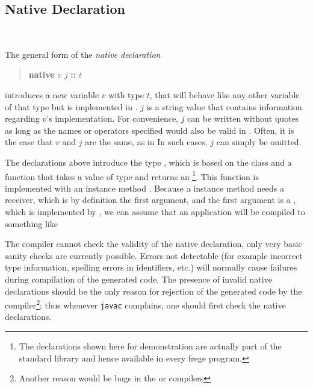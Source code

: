 
\subsection{Native  Declaration} \label{nativefun}

\begin{flushleft}
     \sym{::} \\
  \oder{}  \oder{}  \oder{} 
\end{flushleft}

The general form of the \emph{native declaration}
\begin{quote}
\textbf{native} $v$  $j$ \textbf{::} $t$
\end{quote}
introduces a new variable $v$ with type $t$, that will behave like any other \frege{} variable of that type but is implemented in \java{}. $j$ is a string value that contains information regarding $v$'s \java{} implementation. For convenience, $j$ can be written without quotes as long as the names or operators specified would also be valid in \frege{}. Often, it is the case that $v$ and $j$ are the same, as in 
In such cases, $j$ can simply be omitted.

The declarations above introduce the type , which is based on the \java{} class  and a function  that takes a value of type  and returns an 
\footnote{The declarations shown here for demonstration are actually part of the standard library and hence available in every frege program.}. 
This function is implemented with an instance method . Because a \java{} instance method needs a receiver, which is by definition the first argument, and the first argument is a , which is implemented by  , we can assume that an application  will be compiled to something like 

The \frege{} compiler cannot check the validity of the native declaration, only very basic sanity checks are currently possible.
 Errors not detectable (for example incorrect type information, spelling errors in identifiers, etc.) will normally cause failures during compilation of the generated \java{} code. 
The presence of invalid native declarations should be the only reason for rejection of the generated code by the \java{} compiler\footnote{Another reason would be bugs in the \java{} or \frege{} compilers}; thus whenever \texttt{javac} complains, one should first check the native declarations.

